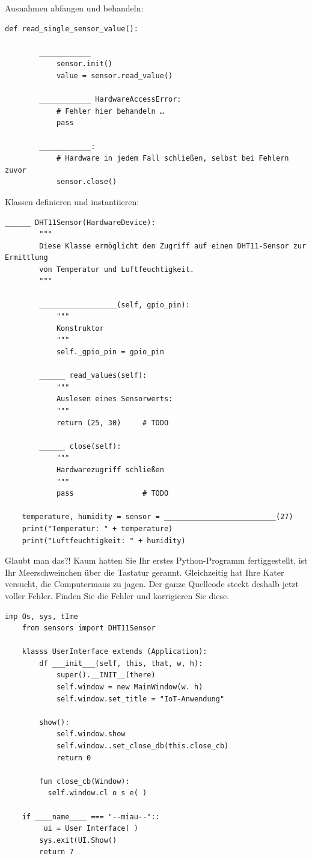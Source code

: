 \teilaufgabe
Ausnahmen abfangen und behandeln:

\begin{Verbatim}[gobble=4]
    def read_single_sensor_value():

        ____________
            sensor.init()
            value = sensor.read_value()

        ____________ HardwareAccessError:
            # Fehler hier behandeln …
            pass

        ____________:
            # Hardware in jedem Fall schließen, selbst bei Fehlern zuvor
            sensor.close()
\end{Verbatim}

\teilaufgabe
Klassen definieren und instantiieren:

\begin{Verbatim}[gobble=4]
    ______ DHT11Sensor(HardwareDevice):
        """
        Diese Klasse ermöglicht den Zugriff auf einen DHT11-Sensor zur Ermittlung
        von Temperatur und Luftfeuchtigkeit.
        """

        __________________(self, gpio_pin):
            """
            Konstruktor
            """
            self._gpio_pin = gpio_pin

        ______ read_values(self):
            """
            Auslesen eines Sensorwerts:
            """
            return (25, 30)     # TODO

        ______ close(self):
            """
            Hardwarezugriff schließen
            """
            pass                # TODO

    temperature, humidity = sensor = __________________________(27)
    print("Temperatur: " + temperature)
    print("Luftfeuchtigkeit: " + humidity)
\end{Verbatim}

\teilaufgabe
Glaubt man das?! Kaum hatten Sie Ihr erstes Python-Programm fertiggestellt, ist
Ihr Meerschweinchen über die Tastatur gerannt. Gleichzeitig hat Ihre Kater versucht,
die Computermaus zu jagen. Der ganze Quellcode steckt deshalb jetzt voller Fehler.
Finden Sie die Fehler und korrigieren Sie diese.

\begin{Verbatim}[gobble=4]
    imp Os, sys, tIme
    from sensors import DHT11Sensor

    klasss UserInterface extends (Application):
        df ___init___(self, this, that, w, h):
            super().__INIT__(there)
            self.window = new MainWindow(w. h)
            self.window.set_title = "IoT-Anwendung"

        show():
            self.window.show
            self.window..set_close_db(this.close_cb)
            return 0

        fun close_cb(Window):
          self.window.cl o s e( )

    if ____name____ === "--miau--"::
         ui = User Interface( )
        sys.exit(UI.Show()
        return 7
\end{Verbatim}

